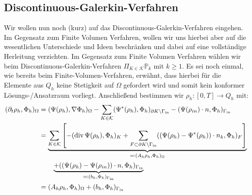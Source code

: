 \subsection{Discontinuous-Galerkin-Verfahren}
Wir wollen nun noch (kurz) auf das Discontinuous-Galerkin-Verfahren eingehen. Im Gegensatz zum Finite Volumen Verfahren, wollen wir uns hierbei aber auf die wesentlichen Unterschiede und Ideen beschränken und dabei auf eine vollständige Herleitung verzichten. \newline
Im Gegensatz zum Finite Volumen Verfahren wählen wir beim Discontinuous-Galerkin-Verfahren $\Pi_{K\in\mathcal{K}} \mathbb{P}_k $ mit $ k \geq 1 $. Es sei noch einmal, wie bereits beim Finite-Volumen-Verfahren, erwähnt, dass hierbei für die Elemente aus $Q_h$ keine Stetigkeit auf $\Omega$ gefordert wird und somit kein konformer Lösungs-/Ansatzraum vorliegt. \newline
Anschließend bestimmen wir $\rho_h : [0,T] \rightarrow Q_h$ mit:
	\begin{align*}
		(\partial_t \rho_h , \Phi_h)_{\Omega} &= (\Psi(\rho_h),\nabla \Phi_h)_{\Omega}
		- \sum_{K \in \mathcal{K}}(\Psi^*(\rho_h),\Phi_h)_{\partial K \setminus \Gamma_{{\text{in}}}}
		-(\Psi(\rho_{in}) \cdot n ,\Phi_h)_{\Gamma_{{\text{in}}}} \\
		&= \underbrace{\sum_{K \in \mathcal{K}} \left[ -( \operatorname{div} \Psi (\rho_h),\Phi_h)_{K}
		+ \sum_{ F \subset \partial K \setminus \Gamma_{{\text{in}}}} ((\Psi(\rho_h)-\Psi ^* (\rho_h)) \cdot n_k , \Phi_h)_F \right]}_{\eqqcolon  (A_h \rho_h, \Phi_h )_{\Omega}} \\		
		&\qquad \underbrace{ +( (\Psi(\rho_h) - \Psi(\rho_{in})) \cdot n,\Phi_h)_{\Gamma_{{\text{in}}}}}_{\eqqcolon(b_h,\Phi_h)_{\Gamma_{{\text{in}}}}}
		 \\
		&= (A_h \rho_h, \Phi_h )_{\Omega} + (b_h,\Phi_h)_{\Gamma_{{\text{in}}}}
	\end{align*}  

